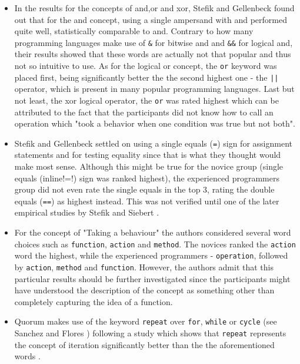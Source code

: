 \begin{itemize}
\item In the results for the concepts of and,or and xor, Stefik and Gellenbeck \cite{EmpStudiesonStimuli} found out that for the and concept, using a single ampersand with and performed quite well, statistically comparable to and. Contrary to how many programming languages make use of \lstinline!&! for bitwise and and \lstinline!&&! for logical and, their results showed that these words are actually not that popular and thus not so intuitive to use. As for the logical or concept, the \lstinline!or! keyword was placed first, being significantly better the the second highest one - the \lstinline!||! operator, which is present in many popular programming languages. Last but not least, the xor logical operator, the \lstinline!or! was rated highest which can be attributed to the fact that the participants did not know how to call an operation which "took a behavior when one condition was true but not both".
\item Stefik and Gellenbeck \cite{EmpStudiesonStimuli} settled on using a single equals (\lstinline!=!) sign for assignment statements and for testing equality since that is what they thought would make most sense. Although this might be true for the novice group (single equals (\!inline!=!) sign was ranked highest), the experienced programmers group did not even rate the single equals in the top 3, rating the double equals (\lstinline!==!) as highest instead. This was not verified until one of the later empirical studies by Stefik and Siebert \cite{Empiricalinvestigation}.
\item For the concept of "Taking a behaviour" the authors considered several word choices such as \lstinline!function!, \lstinline!action! and \lstinline!method!. The novices ranked the \lstinline!action! word the highest, while the experienced programmers - \lstinline!operation!, followed by \lstinline!action!, \lstinline!method! and \lstinline!function!. However, the authors admit that this particular results should be further investigated since the participants might have understood the description of the concept as something other than completely capturing the idea of a function.
\item Quorum makes use of the keyword \lstinline!repeat! over \lstinline!for!, \lstinline!while! or \lstinline!cycle! (see Sanchez and Flores \cite{SanchezData}) following a study which shows that \lstinline!repeat! represents the concept of iteration significantly better than the the aforementioned words \cite{EmpStudiesonStimuli}.
\end{itemize}

